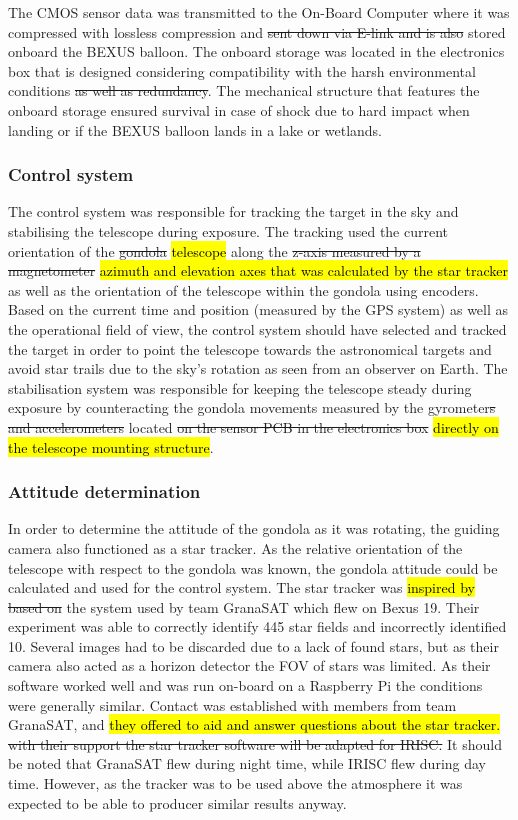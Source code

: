 The CMOS sensor data was transmitted to the On-Board Computer where it was compressed with lossless compression and \st{sent down via E-link and is also} stored onboard the BEXUS balloon. The onboard storage was located in the electronics box that is designed considering compatibility with the harsh environmental conditions \st{as well as redundancy}. The mechanical structure that features the onboard storage ensured survival in case of shock due to hard impact when landing or if the BEXUS balloon lands in a lake or wetlands.


\subsubsection{Control system}
The control system was responsible for tracking the target in the sky and stabilising the telescope during exposure. The tracking used the current orientation of the \st{gondola} \hl{telescope} along the \st{z-axis measured by a magnetometer} \hl{azimuth and elevation axes that was calculated by the star tracker} as well as the orientation of the telescope within the gondola using encoders. Based on the current time and position (measured by the GPS system) as well as the operational field of view, the control system should have selected and tracked the target in order to point the telescope towards the astronomical targets and avoid star trails due to the sky's rotation as seen from an observer on Earth. The stabilisation system was responsible for keeping the telescope steady during exposure by counteracting the gondola movements measured by the gyrometer\st{s and accelerometers} located \st{on the sensor PCB in the electronics box} \hl{directly on the telescope mounting structure}.


\subsubsection{Attitude determination}
\label{sec::4-1_attitude_determination}
In order to determine the attitude of the gondola as it was rotating, the guiding camera also functioned as a star tracker. As the relative orientation of the telescope with respect to the gondola was known, the gondola attitude could be calculated and used for the control system. The star tracker was \hl{inspired by} \st{based on} the system used by team GranaSAT which flew on Bexus 19. Their experiment was able to correctly identify 445 star fields and incorrectly identified 10. Several images had to be discarded due to a lack of found stars, but as their camera also acted as a horizon detector the FOV of stars was limited. As their software worked well and was run on-board on a Raspberry Pi the conditions were generally similar. Contact was established with members from team GranaSAT, and \hl{they offered to aid and answer questions about the star tracker.} \st{with their support the star tracker software will be adapted for IRISC.} It should be noted that GranaSAT flew during night time, while IRISC flew during day time. However, as the tracker was to be used above the atmosphere it was expected to be able to producer similar results anyway.

